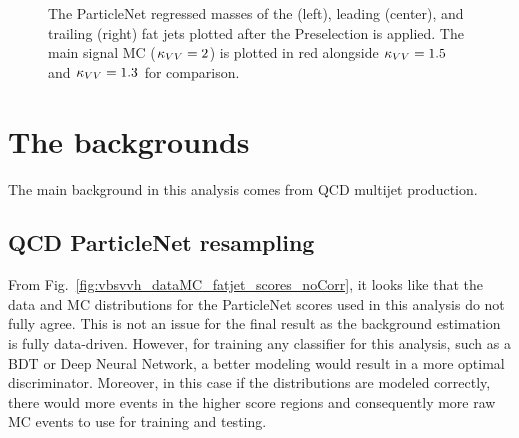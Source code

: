 \begin{figure}[htb]
    \centering
    \qquad
    \qquad
    \caption{
        The ParticleNet regressed masses \MPNet of the \Htobb (left), leading \Vtoqq (center), and trailing \Vtoqq (right) fat jets plotted after the Preselection is applied. 
        The main signal MC ($\kappa_{VV} = 2$) is plotted in red alongside $\kappa_{VV} = 1.5$ and $\kappa_{VV} = 1.3$ for comparison. 
    }
    \label{fig:vbsvvh_fatjet_masses}
\end{figure}

\section{The backgrounds}
The main background in this analysis comes from QCD multijet production. 

\subsection{QCD ParticleNet resampling}
From Fig.~\ref{fig:vbsvvh_dataMC_fatjet_scores_noCorr}, it looks like that the data and MC distributions for the ParticleNet scores used in this analysis do not fully agree. 
This is not an issue for the final result as the background estimation is fully data-driven. 
However, for training any classifier for this analysis, such as a BDT or Deep Neural Network, a better modeling would result in a more optimal discriminator.
Moreover, in this case if the distributions are modeled correctly, there would more events in the higher score regions
and consequently more raw MC events to use for training and testing. 

